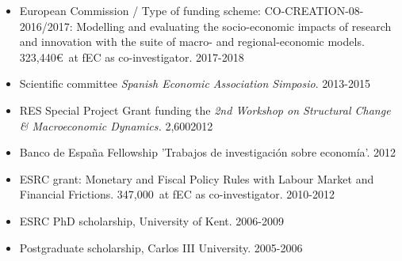 \documentclass[margin, 11pt]{res} %
\begin{document}
\begin{resume}
\begin{itemize}
\item European Commission / Type of funding scheme: CO-CREATION-08-2016/2017: Modelling and evaluating the socio-economic impacts of research and innovation with the suite of macro- and regional-economic models. 323,440\euro$\,$  at fEC  as co-investigator. \hfill 2017-2018
\item Scientific committee \emph{Spanish Economic Association Simposio}. \hfill 2013-2015
\item RES Special Project Grant funding the \emph{2nd Workshop on Structural Change \& Macroeconomic Dynamics.} 2,600\textsterling \hfill 2012
\item Banco de Espa\~{n}a Fellowship 'Trabajos de investigaci\'{o}n sobre econom\'{i}a'. \hfill 2012
\item ESRC grant: Monetary and Fiscal Policy Rules with Labour Market and Financial Frictions. 347,000\textsterling$\,$  at fEC  as co-investigator. \hfill 2010-2012 
\item ESRC PhD scholarship, University of Kent. \hfill 2006-2009
\item Postgraduate scholarship, Carlos III University. \hfill 2005-2006
\end{itemize}



\end{resume}
\end{document}
